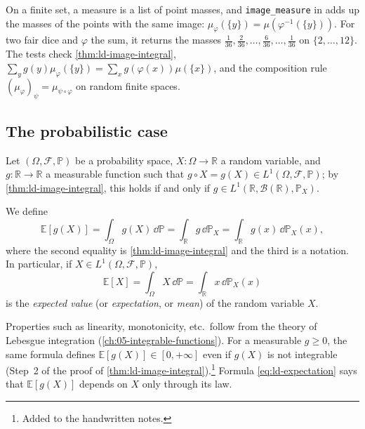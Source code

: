 \begin{remark}[Computational]\label{rem:ld-image-code}
On a finite set, a measure is a list of point masses, and \texttt{image\_measure} in
 adds up the masses of the points with the same image:
$\mu_\varphi(\{y\})=\mu(\varphi^{-1}(\{y\}))$. For two fair dice and $\varphi$ the sum, it returns
the masses $\frac1{36},\frac2{36},\dots,\frac6{36},\dots,\frac1{36}$ on $\{2,\dots,12\}$. The
tests check \cref{thm:ld-image-integral}, $\sum_yg(y)\mu_\varphi(\{y\})=\sum_xg(\varphi(x))\mu(\{x\})$,
and the composition rule $(\mu_\varphi)_\psi=\mu_{\psi\circ\varphi}$ on random finite spaces.
\end{remark}

\subsection{The probabilistic case}\label{sec:ld-probabilistic}

Let $(\Omega,\mathcal F,\mathbb P)$ be a probability space, $X:\Omega\to\mathbb R$ a random
variable, and $g:\mathbb R\to\mathbb R$ a measurable function such that
$g\circ X=g(X)\in L^1(\Omega,\mathcal F,\mathbb P)$; by \cref{thm:ld-image-integral}, this holds
if and only if $g\in L^1(\mathbb R,\mathcal B(\mathbb R),\mathbb P_X)$.

\begin{definition}[Expectation]\label{def:ld-expectation}
We define
\begin{equation}\label{eq:ld-expectation}
  \mathbb E[g(X)]=\int_\Omega g(X)\,\dd\mathbb P=\int_{\mathbb R}g\,\dd\mathbb P_X=\int_{\mathbb R}g(x)\,\dd\mathbb P_X(x),
\end{equation}
where the second equality is \cref{thm:ld-image-integral} and the third is a notation. In
particular, if $X\in L^1(\Omega,\mathcal F,\mathbb P)$,
\[
  \mathbb E[X]=\int_\Omega X\,\dd\mathbb P=\int_{\mathbb R}x\,\dd\mathbb P_X(x)
\]
is the \emph{expected value} (or \emph{expectation}, or \emph{mean}) of the random variable $X$.
\end{definition}

Properties such as linearity, monotonicity, etc.\ follow from the theory of Lebesgue
integration (\cref{ch:05-integrable-functions}). For a measurable $g\ge0$, the same formula
defines $\mathbb E[g(X)]\in[0,+\infty]$ even if $g(X)$ is not integrable (Step~2 of the proof of
\cref{thm:ld-image-integral}).\footnote{Added to the handwritten notes.} Formula
\eqref{eq:ld-expectation} says that $\mathbb E[g(X)]$ depends on $X$ only through its law.

